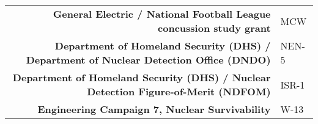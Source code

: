 
\begin{minipage}{\textwidth}
	\begin{center}
		\begin{tabular}{rl}
			\textbf{General Electric / National Football League concussion study grant} & MCW \\
			\textbf{Department of Homeland Security (DHS) / Department of Nuclear Detection Office (DNDO)} & NEN-5 \\
			\textbf{Department of Homeland Security (DHS) / Nuclear Detection Figure-of-Merit (NDFOM)} & ISR-1 \\
			\textbf{Engineering Campaign 7, Nuclear Survivability} & W-13 \\
		\end{tabular}
	\end{center}
\end{minipage}
